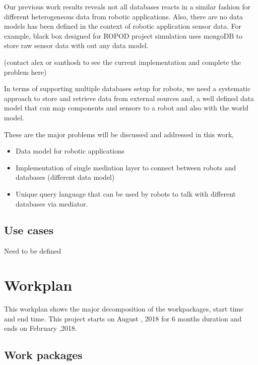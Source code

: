 \documentclass[12pt]{article}
\begin{document}
Our previous work results reveals not all databases reacts in a similar fashion for different heterogeneous data from robotic applications. Also, there are no data models has been defined in the context of robotic application sensor data. For example, black box designed for ROPOD project simulation uses mongoDB to store raw sensor data with out any data model. 

(contact alex or santhosh to see the current implementation and complete the problem here)

In terms of supporting multiple databases setup for robots,  we need a systematic approach to store and retrieve data from external sources and, a well defined data model that can map components and sensors to a robot and also with the world model.

These are the major problems will be discussed and addressed in this work,
\begin{itemize}
	\item Data model for robotic applications
	\item Implementation of single mediation layer to connect between robots and databases (different data model)
	\item Unique query language that can be used by robots to talk with different databases via mediator.
\end{itemize}



\subsection{Use cases}
Need to be defined

\section{Workplan}
This workplan shows the major decomposition of the workpackages, start time and end time. This project starts on August , 2018 for 6 months duration and ends on February ,2018.
\newpage
\subsection{Work packages}


\end{document}
